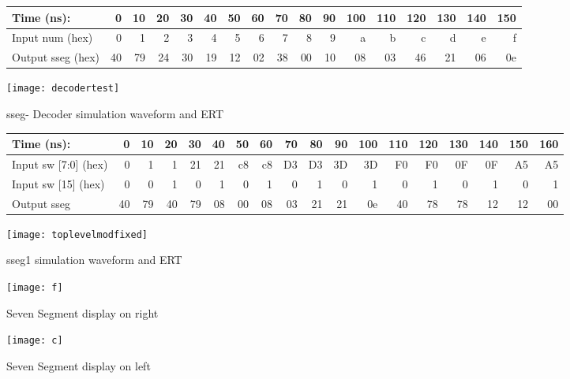 \documentclass[11pt]{article}
\begin{document}
\begin{figure}[ht]\centering
	\begin{tabular}{l|rrrrrrrrrrrrrrrr}
		Time (ns): & 0 & 10 & 20 & 30 & 40 & 50 & 60 & 70 & 80 & 90 & 100 & 110 & 120 & 130 & 140 & 150 \\
		\midrule 
		Input num (hex) & 0 & 1 & 2 & 3 & 4 & 5 & 6 & 7 & 8 & 9 & a & b & c & d & e & f \\
		
		\bottomrule
		Output sseg (hex) & 40 & 79 & 24 & 30 & 19 & 12 & 02 & 38 & 00 & 10 & 08 & 03 & 46 & 21 & 06 & 0e \\
	\end{tabular}\medskip
	
	\texttt{[image: decodertest]}
	\caption{sseg- Decoder simulation waveform and ERT}
	\label{fig:sim_with_table}
\end{figure}
\clearpage

\begin{figure}[ht]\centering
	\begin{tabular}{l|rrrrrrrrrrrrrrrrr}
		Time (ns): & 0 & 10 & 20 & 30 & 40 & 50 & 60 & 70 & 80 & 90 & 100 & 110 & 120 & 130 & 140 & 150 & 160 \\
		\midrule 
		Input sw [7:0] (hex) & 0 & 1 & 1 & 21 & 21 & c8 & c8 & D3 & D3 & 3D & 3D & F0 & F0 & 0F & 0F & A5 & A5 \\
		
		Input sw [15] (hex) & 0 & 0 & 1 & 0 & 1 & 0 & 1 & 0 & 1 & 0 & 1 & 0 & 1 & 0 & 1 & 0 & 1  \\
		
		\bottomrule
		Output sseg & 40 & 79 & 40 & 79 & 08 & 00 & 08 & 03 & 21 & 21 & 0e & 40 & 78 & 78 & 12 & 12 & 00 \\
	\end{tabular}\medskip
	
	\texttt{[image: toplevelmodfixed]}
	\caption{sseg1 simulation waveform and ERT}
	\label{fig:sim_with_table}
\end{figure}


\begin{figure}[ht]\centering
	
	\texttt{[image: f]}
	\caption{Seven Segment display on right}
	\label{fig:sim_with_table}
\end{figure}
\clearpage

\begin{figure}[ht]\centering
	
	\texttt{[image: c]}
	\caption{Seven Segment display on left}
	\label{fig:sim_with_table}
\end{figure}
\clearpage
\end{document}
